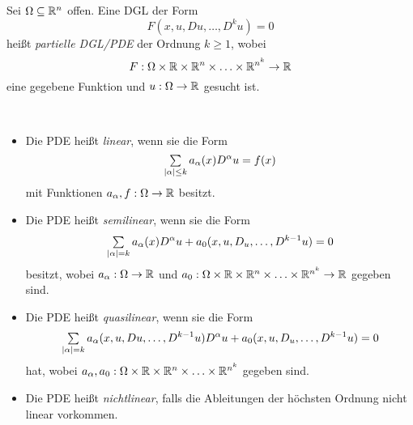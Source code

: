 \documentclass{cheat-sheet}
\begin{document}
\raggedcolumns %






\begin{defn}
  Sei $\Omega \subseteq \mathbb{R}^n$ offen.
  Eine DGL der Form
  \[ F(x, u, Du, \ldots, D^k u) = 0 \]
  heißt \emph{partielle DGL/PDE} der Ordnung $k \geq 1$, wobei
  \[ F : \Omega \times \mathbb{R} \times \mathbb{R}^n \times \ldots \times \mathbb{R}^{n^k} \to \mathbb{R} \]
  eine gegebene Funktion und $u : \Omega \to \mathbb{R}$ gesucht ist.
\end{defn}

\begin{defn}\mbox{}\\
  \begin{itemize}
    \item Die PDE heißt \emph{linear}, wenn sie die Form
    \[ \sum_{\abs{\alpha} \leq k} a_\alpha(x) D^\alpha u = f(x) \]
    mit Funktionen $a_\alpha, f : \Omega \to \mathbb{R}$ besitzt.
    \item Die PDE heißt \emph{semilinear}, wenn sie die Form
    \[ \sum_{\abs{\alpha} = k} a_\alpha(x) D^\alpha u + a_0(x, u, D_u, \ldots, D^{k-1} u) = 0 \]
    besitzt, wobei $a_\alpha : \Omega \to \mathbb{R}$ und $a_0 : \Omega \times \mathbb{R} \times \mathbb{R}^n \times \ldots \times \mathbb{R}^{n^k} \to \mathbb{R}$ gegeben sind.
    \item Die PDE heißt \emph{quasilinear}, wenn sie die Form
    \[ \sum_{\abs{\alpha} = k} a_\alpha(x, u, Du, \ldots, D^{k-1} u) D^\alpha u + a_0(x, u, D_u, \ldots, D^{k-1} u) = 0 \]
    hat, wobei $a_\alpha, a_0 : \Omega \times \mathbb{R} \times \mathbb{R}^n \times \ldots \times \mathbb{R}^{n^k}$ gegeben sind.
    \item Die PDE heißt \emph{nichtlinear}, falls die Ableitungen der höchsten Ordnung nicht linear vorkommen.
  \end{itemize}
\end{defn}

\end{document}
